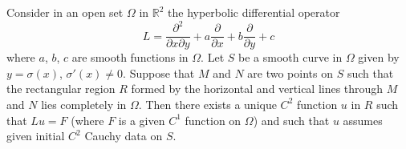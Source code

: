 \begin{theorem*}
Consider in an open set $\Omega$ in $\mathbb{R}^{2}$ the hyperbolic differential operator
$$
L=\frac{\partial^{2}}{\partial x\partial y}+a\frac{\partial}{\partial x}+b\frac{\partial}{\partial y}+c
$$\pageoriginale
where $a$, $b$, $c$ are smooth functions in $\Omega$. Let $S$ be a smooth curve in $\Omega$ given by $y=\sigma(x)$, $\sigma'(x)\neq 0$. Suppose that $M$ and $N$ are two points on $S$ such that the rectangular region $R$ formed by the horizontal and vertical lines through $M$ and $N$ lies completely in $\Omega$. Then there exists a unique $C^{2}$ function $u$ in $R$ such that $Lu=F$ (where $F$ is a given $C^{1}$ function on $\Omega$) and such that $u$ assumes given initial $C^{2}$ Cauchy data on $S$.
\end{theorem*}
